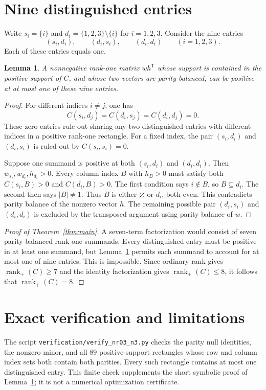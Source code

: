 \documentclass[11pt]{article}
\newtheorem{lemma}[theorem]{Lemma}
\newcommand{\rank}{\operatorname{rank}}
\begin{document}
\section{Nine distinguished entries}
Write $s_i=\{i\}$ and $d_i=\{1,2,3\}\setminus\{i\}$ for $i=1,2,3$. Consider the nine entries
\[
 (s_i,d_i),\qquad(d_i,s_i),\qquad(d_i,d_i)
 \qquad(i=1,2,3).
\]
Each of these entries equals one.

\begin{lemma}\label{lem:nine}
A nonnegative rank-one matrix $wh^{\mathsf T}$ whose support is contained in the positive support of $C$, and whose two vectors are parity balanced, can be positive at at most one of these nine entries.
\end{lemma}
\begin{proof}
For different indices $i\ne j$, one has
\[
 C(s_i,d_j)=C(d_i,s_j)=C(d_i,d_j)=0.
\]
These zero entries rule out sharing any two distinguished entries with different indices in a positive rank-one rectangle. For a fixed index, the pair $(s_i,d_i)$ and $(d_i,s_i)$ is ruled out by $C(s_i,s_i)=0$.

Suppose one summand is positive at both $(s_i,d_i)$ and $(d_i,d_i)$. Then $w_{s_i},w_{d_i},h_{d_i}>0$. Every column index $B$ with $h_B>0$ must satisfy both $C(s_i,B)>0$ and $C(d_i,B)>0$. The first condition says $i\notin B$, so $B\subseteq d_i$. The second then says $|B|\ne1$. Thus $B$ is either $\varnothing$ or $d_i$, both even. This contradicts parity balance of the nonzero vector $h$. The remaining possible pair $(d_i,s_i)$ and $(d_i,d_i)$ is excluded by the transposed argument using parity balance of $w$.
\end{proof}

\begin{proof}[Proof of Theorem~\ref{thm:main}]
A seven-term factorization would consist of seven parity-balanced rank-one summands. Every distinguished entry must be positive in at least one summand, but Lemma~\ref{lem:nine} permits each summand to account for at most one of nine entries. This is impossible. Since ordinary rank gives $\rank_+(C)\geq7$ and the identity factorization gives $\rank_+(C)\leq8$, it follows that $\rank_+(C)=8$.
\end{proof}

\section{Exact verification and limitations}
The script \texttt{verification/verify\_nr03\_n3.py} checks the parity null identities, the nonzero minor, and all $89$ positive-support rectangles whose row and column index sets both contain both parities. Every such rectangle contains at most one distinguished entry. This finite check supplements the short symbolic proof of Lemma~\ref{lem:nine}; it is not a numerical optimization certificate.
\end{document}
